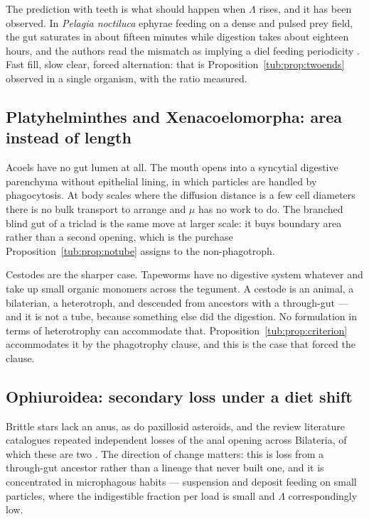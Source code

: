 The prediction with teeth is what should happen when $\Lambda$ rises, and it has
been observed. In \emph{Pelagia noctiluca} ephyrae feeding on a dense and pulsed
prey field, the gut saturates in about fifteen minutes while digestion takes
about eighteen hours, and the authors read the mismatch as implying a diel
feeding periodicity \cite{gordoa2013}. Fast fill, slow clear, forced
alternation: that is Proposition~\ref{tub:prop:twoends} observed in a single
organism, with the ratio measured.

\subsection{Platyhelminthes and Xenacoelomorpha: area instead of length}

Acoels have no gut lumen at all. The mouth opens into a syncytial digestive
parenchyma without epithelial lining, in which particles are handled by
phagocytosis. At body scales where the diffusion distance is a few cell
diameters there is no bulk transport to arrange and $\mu$ has no work to do. The
branched blind gut of a triclad is the same move at larger scale: it buys
boundary area rather than a second opening, which is the purchase
Proposition~\ref{tub:prop:notube} assigns to the non-phagotroph.

Cestodes are the sharper case. Tapeworms have no digestive system whatever and
take up small organic monomers across the tegument. A cestode is an animal, a
bilaterian, a heterotroph, and descended from ancestors with a through-gut ---
and it is not a tube, because something else did the digestion. No formulation in
terms of heterotrophy can accommodate that. Proposition~\ref{tub:prop:criterion}
accommodates it by the phagotrophy clause, and this is the case that forced the
clause.

\subsection{Ophiuroidea: secondary loss under a diet shift}

Brittle stars lack an anus, as do paxillosid asteroids, and the review
literature catalogues repeated independent losses of the anal opening across
Bilateria, of which these are two \cite{hejnol2015,jangoux1982}. The direction of
change matters: this is loss from a through-gut ancestor rather than a lineage
that never built one, and it is concentrated in microphagous habits ---
suspension and deposit feeding on small particles, where the indigestible
fraction per load is small and $\Lambda$ correspondingly low.

